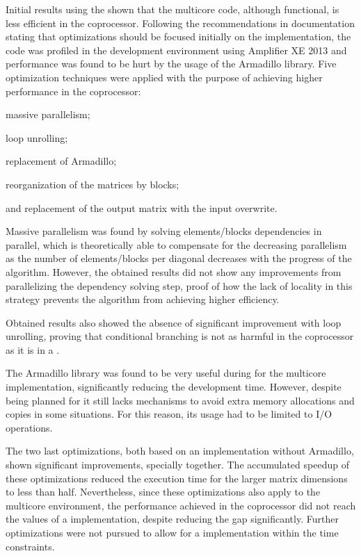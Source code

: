 \documentclass[../thesis]{subfiles}
\begin{document}
	Initial results using the \intel\xeonphi shown that the multicore code, although functional, is less efficient in the coprocessor. Following the recommendations in \intel documentation stating that optimizations should be focused initially on the \cpu implementation, the code was profiled in the development environment using \intel\vtune Amplifier XE 2013 and performance was found to be hurt by the usage of the Armadillo library. Five optimization techniques were applied with the purpose of achieving higher performance in the \intel\xeonphi coprocessor:
	\begin{inparaenum}[(a)]
		\item massive parallelism;
		\item loop unrolling;
		\item replacement of Armadillo;
		\item reorganization of the matrices by blocks;
		\item and replacement of the output matrix with the input overwrite.
	\end{inparaenum}

	Massive parallelism was found by solving elements/blocks dependencies in parallel, which is theoretically able to compensate for the decreasing parallelism as the number of elements/blocks per diagonal decreases with the progress of the algorithm. However, the obtained results did not show any improvements from parallelizing the dependency solving step, proof of how the lack of locality in this strategy prevents the algorithm from achieving higher efficiency. 

	Obtained results also showed the absence of significant improvement with loop unrolling, proving that conditional branching is not as harmful in the coprocessor as it is in a \gpu.

	The Armadillo library was found to be very useful during for the multicore implementation, significantly reducing the development time. However, despite being planned for \hpc it still lacks mechanisms to avoid extra memory allocations and copies in some situations. For this reason, its usage had to be limited to I/O operations.

	The two last optimizations, both based on an implementation without Armadillo, shown significant improvements, specially together. The accumulated speedup of these optimizations reduced the execution time for the larger matrix dimensions to less than half. Nevertheless, since these optimizations also apply to the multicore environment, the performance achieved in the coprocessor did not reach the values of a \cpu implementation, despite reducing the gap significantly. Further optimizations were not pursued to allow for a \cuda implementation within the time constraints.
\end{document}

